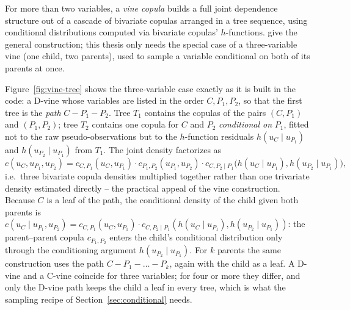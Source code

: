 \documentclass[
  english,
  class=report,
  accentcolor=2c,
  marginpar=false,
  parskip=half-,
  fontsize=11pt,
  ruledheaders=false,
  pdfa=false,
  IMRAD=false,
  thesis={type=master}
]{tudapub}
\begin{document}
For more than two variables, a \emph{vine copula} builds a full joint
dependence structure out of a cascade of bivariate copulas arranged in a tree
sequence, using conditional distributions computed via bivariate copulas'
$h$-functions. \textcite{nagler2016} give the general construction; this
thesis only needs the special case of a three-variable vine (one child, two
parents), used to sample a variable conditional on both of its parents at
once.

Figure~\ref{fig:vine-tree} shows the three-variable case exactly as it is
built in the code: a D-vine \parencite{bedford2002,aas2009,czado2019} whose
variables are listed in the order $C, P_1, P_2$, so that the first tree is
the \emph{path} $C - P_1 - P_2$. Tree $T_1$ contains the copulas of the
pairs $(C,P_1)$ and $(P_1,P_2)$; tree $T_2$ contains one copula for $C$
and $P_2$ \emph{conditional on} $P_1$, fitted not to the raw
pseudo-observations but to the $h$-function residuals $h(u_C \mid
u_{P_1})$ and $h(u_{P_2} \mid u_{P_1})$ from $T_1$. The joint density
factorizes as
\begin{equation}
c(u_C, u_{P_1}, u_{P_2}) = c_{C,P_1}(u_C, u_{P_1}) \cdot c_{P_1,P_2}(u_{P_1},
u_{P_2}) \cdot c_{C,P_2 \mid P_1}\bigl(h(u_C \mid u_{P_1}), h(u_{P_2}
\mid u_{P_1})\bigr),
\label{eq:vine-density}
\end{equation}
i.e.\ three bivariate copula densities multiplied together rather than one
trivariate density estimated directly -- the practical appeal of the vine
construction. Because $C$ is a leaf of the path, the conditional density
of the child given both parents is $c(u_C \mid u_{P_1}, u_{P_2}) =
c_{C,P_1}(u_C,u_{P_1}) \cdot c_{C,P_2\mid P_1}(h(u_C\mid u_{P_1}),
h(u_{P_2}\mid u_{P_1}))$: the parent--parent copula $c_{P_1,P_2}$ enters
the child's conditional distribution only through the conditioning
argument $h(u_{P_2}\mid u_{P_1})$. For $k$ parents the same construction
uses the path $C - P_1 - \dots - P_k$, again with the child as a leaf. A
D-vine and a C-vine coincide for three variables; for four or more they
differ, and only the D-vine path keeps the child a leaf in every tree,
which is what the sampling recipe of Section~\ref{sec:conditional} needs.
\end{document}
